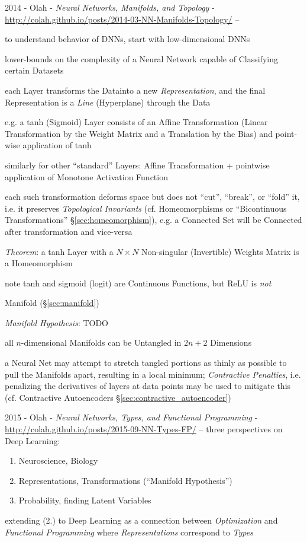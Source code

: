 \asterism

2014 - Olah - \emph{Neural Networks, Manifolds, and Topology} -
\url{http://colah.github.io/posts/2014-03-NN-Manifolds-Topology/} --

to understand behavior of DNNs, start with low-dimensional DNNs

lower-bounds on the complexity of a Neural Network capable of Classifying
certain Datasets

each Layer transforms the Datainto a new \emph{Representation}, and the
final Representation is a \emph{Line} (Hyperplane) through the Data

e.g. a tanh (Sigmoid) Layer consists of an Affine Transformation (Linear
Transformation by the Weight Matrix and a Translation by the Bias) and
point-wise application of tanh

similarly for other ``standard'' Layers: Affine Transformation + pointwise
application of Monotone Activation Function

each such transformation deforms space but does not ``cut'', ``break'', or
``fold'' it, i.e. it preserves \emph{Topological Invariants} (cf. Homeomorphisms
or ``Bicontinuous Transformations'' \S\ref{sec:homeomorphism}), e.g. a Connected
Set will be Connected after transformation and vice-versa

\emph{Theorem}: a tanh Layer with a $N \times N$ Non-singular (Invertible)
Weights Matrix is a Homeomorphism

note tanh and sigmoid (logit) are Continuous Functions, but ReLU is \emph{not}

Manifold (\S\ref{sec:manifold})

\emph{Manifold Hypothesis}: TODO

all $n$-dimensional Manifolds can be Untangled in $2n + 2$ Dimensions

a Neural Net may attempt to stretch tangled portions as thinly as possible to
pull the Manifolds apart, resulting in a local minimum; \emph{Contractive
  Penalties}, i.e. penalizing the derivatives of layers at data points may be
used to mitigate this (cf. Contractive Autoencoders
\S\ref{sec:contractive_autoencoder})

\asterism

2015 - Olah - \emph{Neural Networks, Types, and Functional Programming}
- \url{http://colah.github.io/posts/2015-09-NN-Types-FP/} --
three perspectives on Deep Learning:
\begin{enumerate}
  \item Neuroscience, Biology
  \item Representations, Transformations (``Manifold Hypothesis'')
  \item Probability, finding Latent Variables
\end{enumerate}
extending (2.) to Deep Learning as a connection between \emph{Optimization} and
\emph{Functional Programming} where \emph{Representations} correspond to
\emph{Types}

